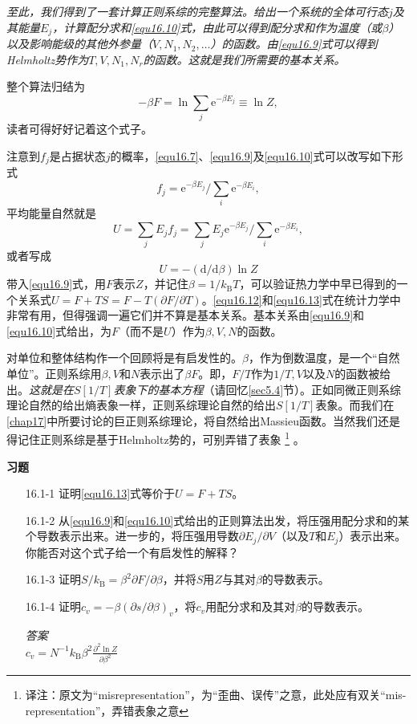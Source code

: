 {\it 至此，我们得到了一套计算正则系综的完整算法。给出一个系统的全体可行态$j$及其能量$E_j$，计算配分求和\ref{equ16.10}式，由此可以得到配分求和作为温度（或$\beta$）以及影响能级的其他外参量（$V,N_1,N_2,\dots$）的函数。由\eqref{equ16.9}式可以得到Helmholtz势作为$T,V,N_1,N_r$的函数。这就是我们所需要的基本关系。}

整个算法归结为
\begin{equation}
-\beta F = \ln \sum\limits_j \mathrm e^{-\beta E_j} \equiv \ln Z,
\end{equation}
读者可得好好记着这个式子。

注意到$f_j$是占据状态$j$的概率，\eqref{equ16.7}、\eqref{equ16.9}及\eqref{equ16.10}式可以改写如下形式
\begin{equation}
f_j  = {\mathrm e}^{-\beta E_j}/\sum\limits_i \mathrm e^{-\beta E_i},
\end{equation}
平均能量自然就是
\begin{equation}
U = \sum\limits_j E_jf_j = \sum\limits_j E_j{\mathrm e}^{-\beta E_j}/\sum\limits_i \mathrm e^{-\beta E_i},
\label{equ16.12}
\end{equation}
或者写成
\begin{equation}
U = -(\mathrm d/\mathrm d\beta)\ln Z
\label{equ16.13}
\end{equation}
带入\eqref{equ16.9}式，用$F$表示$Z$，并记住$\beta = 1/k_\text{B}T$，可以验证热力学中早已得到的一个关系式$U=F+TS=F-T(\partial F/\partial T)$。\eqref{equ16.12}和\eqref{equ16.13}式在统计力学中非常有用，但得强调一遍它们并不算是基本关系。基本关系由\eqref{equ16.9}和\eqref{equ16.10}式给出，为$F$（而不是$U$）作为$\beta,V,N$的函数。

对单位和整体结构作一个回顾将是有启发性的。$\beta$，作为倒数温度，是一个“自然单位”。正则系综用$\beta,V$和$N$表示出了$\beta F$。即，$F/T$作为$1/T,V$以及$N$的函数被给出。{\it 这就是在$S[1/T]$表象下的基本方程}（请回忆\ref{sec5.4}节）。正如同微正则系综理论自然的给出熵表象一样，正则系综理论自然的给出$S[1/T]$表象。而我们在\ref{chap17}中所要讨论的巨正则系综理论，将自然给出Massieu函数。当然我们还是得记住正则系综是基于Helmholtz势的，可别弄错了表象%
\footnote{译注：原文为``misrepresentation''，为“歪曲、误传”之意，此处应有双关``mis-representation''，弄错表象之意}%
。

{\noindent\bf 习题}
\begin{itemize}
\item[16.1-1] 证明\eqref{equ16.13}式等价于$U=F+TS$。
\item[16.1-2] 从\eqref{equ16.9}和\eqref{equ16.10}式给出的正则算法出发，将压强用配分求和的某个导数表示出来。进一步的，将压强用导数$\partial E_j/\partial V$（以及$T$和$E_j$）表示出来。你能否对这个式子给一个有启发性的解释？
\item[16.1-3] 证明$S/k_\text{B}=\beta^2\partial F/\partial\beta$，并将$S$用$Z$与其对$\beta$的导数表示。
\item[16.1-4] 证明$c_v=-\beta(\partial s/\partial\beta)_v$，将$c_v$用配分求和及其对$\beta$的导数表示。
\begin{flushleft}
{\it 答案}\\
$c_v=N^{-1}k_\text{B}\beta^2\frac{\partial^2\ln Z}{\partial \beta^2}$
\end{flushleft}
\end{itemize}